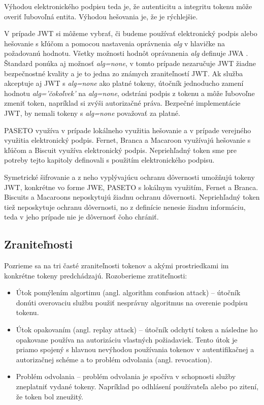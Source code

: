 Výhodou elektronického podpisu teda je, že autenticitu a integritu tokenu môže overiť ľubovoľná entita. Výhodou hešovania je, že je rýchlejšie. 

V prípade JWT si môžeme vybrať, či budeme používať elektronický podpis alebo hešovanie s kľúčom a pomocou nastavenia oprávnenia \textit{alg} v hlavičke na požadovanú hodnotu. Všetky možnosti hodnôt oprávanenia \textit{alg} definuje  JWA \cite{jwa_rfc}. Štandard ponúka aj možnosť \textit{alg=none}, v tomto prípade nezaručuje JWT žiadne bezpečnostné kvality a je to jedna zo známych zraniteľností \cite{jwt_vul} JWT. Ak služba akceptuje aj JWT s \textit{alg=none} ako platné tokeny, útočník jednoducho zamení hodnotu \textit{alg='čokoľvek'} na \textit{alg=none}, odstráni podpis z tokenu a môže ľubovoľne zmeniť token, napríklad si zvýši autorizačné práva. Bezpečné implementácie JWT, by nemali tokeny s \textit{alg=none} považovať za platné.

PASETO využíva v prípade lokálneho využitia hešovanie a v prípade verejného využitia elektronický podpis. Fernet, Branca a Macaroon využívajú hešovanie s kľúčom a Biscuit využíva elektronický podpis. Nepriehľadný token sme pre potreby tejto kapitoly definovali s použitím elektronického podpisu.

Symetrické šifrovanie a z neho vyplývajúcu ochranu dôvernosti umožňujú tokeny JWT, konkrétne vo forme JWE, PASETO s lokálnym využitím, Fernet a Branca. Biscuits a Macaroons neposkytujú žiadnu ochranu dôvernosti. Nepriehľadný token tiež neposkytuje ochranu dôvernosti, no z definície nenesie žiadnu informáciu, teda v jeho prípade nie je dôvernosť čoho chrániť.

\subsection{Zraniteľnosti}

Pozrieme sa na tri časté zraniteľnosti tokenov a akými prostriedkami im konkrétne tokeny predchádzajú. Rozoberieme zratiteľnosti:

\begin{itemize}
    \item Útok pomýlením algortimu (angl. algorithm confusion attack) -- útočník donúti overovaciu službu použiť nesprávny algoritmus na overenie podpisu tokenu. 
    \item Útok opakovaním (angl. replay attack) -- útočník odchytí token a následne ho opakovane používa na autorizáciu vlastných požiadaviek. Tento útok je priamo spojený s hlavnou nevýhodou používania tokenov v autentifikačnej a autorizačnej schéme a to problém odvolania (angl. revocation).
    \item Problém odvolania -- problém odvolania je spočíva v schopnosti služby zneplatniť vydané tokeny. Napríklad po odhlásení používateľa alebo po zitení, že token bol zneužitý.
\end{itemize}

